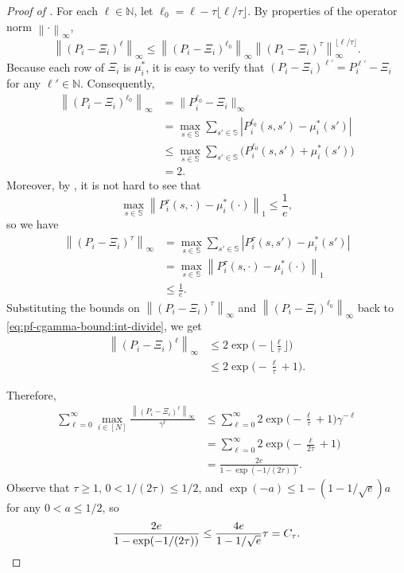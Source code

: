 \documentclass[10pt,a4paper]{amsart}
\newcommand{\Ctau}{C_\tau}
\newcommand{\abs}[1]{\left\lvert#1\right\rvert}
\newcommand{\normbig}[1]{\big\lVert#1\big\rVert}
\newcommand{\norm}[1]{\left\lVert#1\right\rVert}
\newcommand{\sspa}{\mathbb{S}}
\begin{document}
\begin{proof}[Proof of ]
    For each $\ell \in \mathbb{N}$, let $\ell_0 = \ell - \tau \lfloor \ell/\tau\rfloor$. 
    By properties of the operator norm $\norm{\cdot}_\infty$, 
    \begin{equation}
        \label{eq:pf-cgamma-bound:int-divide}
        \norm{(P_i - \Xi_i)^\ell}_\infty \leq \norm{(P_i - \Xi_i)^{\ell_0}}_\infty \norm{(P_i - \Xi_i)^\tau}_\infty^{\lfloor \ell/\tau \rfloor}. 
    \end{equation}
    Because each row of $\Xi_i$ is $\mu_i^*$, it is easy to verify that $(P_i - \Xi_i)^{\ell'} = P_i^{\ell'} - \Xi_i$ for any $\ell' \in \mathbb{N}$. Consequently, 
    \begin{align*}
        \norm{(P_i - \Xi_i)^{\ell_0}}_\infty
        &= \normbig{P_i^{\ell_0} - \Xi_i}_\infty \\
        &= \max_{s\in\sspa} \sum_{s'\in\sspa} \abs{P_i^{\ell_0}(s,s') - \mu_i^*(s')}  \\
        &\leq \max_{s\in\sspa} \sum_{s'\in\sspa} \big(P_i^{\ell_0}(s,s') + \mu_i^*(s')\big) \\
        &= 2.
    \end{align*}
    Moreover, by , it is not hard to see that 
    \[
        \max_{s\in\sspa} \norm{P_i^\tau(s,\cdot) - \mu_i^*(\cdot)}_1 \leq \frac{1}{e},
    \]
    so we have
    \begin{align}
        \nonumber
        \norm{(P_i - \Xi_i)^\tau}_\infty 
        &= \max_{s\in\sspa} \sum_{s'\in\sspa} \abs{P_i^\tau(s,s') - \mu_i^*(s')} \\
        \nonumber
        &= \max_{s\in\sspa} \norm{P_i^\tau(s,\cdot) - \mu_i^*(\cdot)}_1 \\
        \nonumber
        &\leq \frac{1}{e}.
    \end{align}
    Substituting the bounds on $\norm{(P_i - \Xi_i)^\tau}_\infty$ and $\norm{(P_i - \Xi_i)^{\ell_0}}_\infty$ back to \eqref{eq:pf-cgamma-bound:int-divide}, we get 
    \begin{align}
        \nonumber
        \norm{(P_i - \Xi_i)^\ell}_\infty
        &\leq 2\exp\Big(-\Big\lfloor \frac{\ell}{\tau} \Big\rfloor\Big) \\
        &\leq 2\exp\Big(-\frac{\ell}{\tau} + 1\Big).
    \end{align}

    Therefore, 
    \begin{align}
        \nonumber
        \sum_{\ell=0}^{\infty} \max_{i\in[N]}\frac{\norm{(P_i-\Xi_i)^\ell}_\infty}{\gamma^\ell}
        &\leq \sum_{\ell=0}^{\infty} 2\exp\Big(-\frac{\ell}{\tau} + 1\Big) \gamma^{-\ell} \\
        \nonumber
        &= \sum_{\ell=0}^{\infty} 2\exp\Big(-\frac{\ell}{2\tau} + 1\Big) \\
        &= \frac{2e}{1 - \exp(-1/(2\tau))}. 
    \end{align}
    Observe that $\tau \geq 1$, $0 < 1/(2\tau) \leq 1/2$, and $\exp(-a) \leq 1 - (1-1/\sqrt{e}) a$ for any $0 < a \leq 1/2$, so
    \[
        \frac{2e}{1 - \exp(-1/(2\tau))} \leq \frac{4e}{1-1/\sqrt{e}} \tau = \Ctau. \qedhere
    \]
\end{proof}
\end{document}
